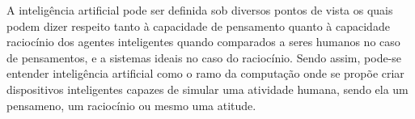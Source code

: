 A inteligência artificial pode ser definida sob diversos pontos de vista os quais podem dizer respeito tanto à capacidade de pensamento quanto à capacidade raciocínio dos agentes inteligentes quando comparados a seres humanos no caso de pensamentos, e a sistemas ideais no caso do raciocínio. \cite{norvig2014inteligencia}
Sendo assim, pode-se entender inteligência artificial como o ramo da computação onde se propõe criar dispositivos inteligentes capazes de simular uma atividade humana, sendo ela um pensameno, um raciocínio ou mesmo uma atitude.